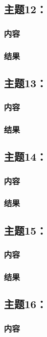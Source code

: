 \documentclass{article}
\begin{document}
\subsection{主题12：}  
\subsubsection{内容}
\subsubsection{结果}  
\vspace{1cm}
\subsection{主题13：}  
\subsubsection{内容}
\subsubsection{结果}  
\vspace{1cm}
\subsection{主题14：}  
\subsubsection{内容}
\subsubsection{结果}  
\newpage
\thispagestyle{empty}
\subsection{主题15：}  
\subsubsection{内容}
\subsubsection{结果}  
\vspace{1cm}
\subsection{主题16：}  
\subsubsection{内容}
\end{document}

